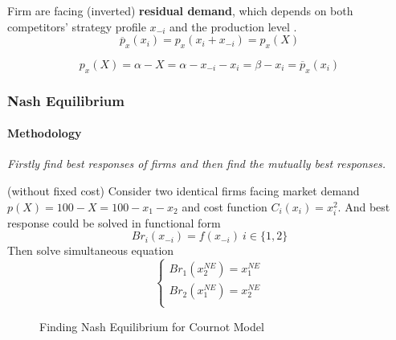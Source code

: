\documentclass[]{article}
\begin{document}
                \begin{definition}
                    Firm are facing (inverted) \textbf{residual demand}, which depends on both competitors' strategy profile $x_{-i}$ and the production level .
                    \[
                        \overline{p}_x(x_i) = p_x(x_i + x_{-i}) = p_x(X)
                    \]
                \end{definition}
                
                \begin{example}
                    \[
                        p_x(X) = \alpha - X = \alpha - x_{-i} - x_i = \beta - x_i = \overline{p}_x(x_i)
                    \]
                \end{example}
                
            \subsubsection{Nash Equilibrium}
                \paragraph{Methodology} \emph{Firstly find best responses of firms and then find the mutually best responses.}
                
                \begin{example} (without fixed cost)
                    Consider two identical firms facing market demand $p(X) = 100 - X = 100 - x_1 - x_2$ and cost function $C_i(x_i) = x_i^2$. And best response could be solved in functional form
                    \[
                        Br_i(x_{-i}) = f(x_{-i})\ i \in \{1, 2\}
                    \]
                    Then solve simultaneous equation
                    \[
                        \begin{cases}
                            Br_1(x_2^{NE}) = x_1^{NE} \\
                            Br_2(x_1^{NE}) = x_2^{NE} \\
                        \end{cases}
                    \]
                \end{example}
                
                \begin{figure}
                    \centering
                    \caption{Finding Nash Equilibrium for Cournot Model}
                \end{figure}
                
\end{document}
